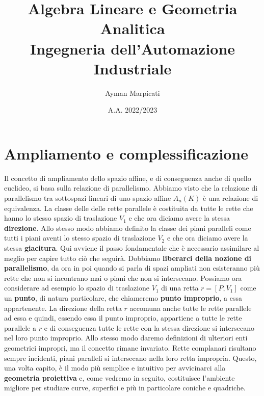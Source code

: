 \documentclass[twoside]{report}
\title{\Huge{Algebra Lineare e Geometria Analitica}\\Ingegneria dell'Automazione Industriale}
\author{\Large{Ayman Marpicati}}
\date{A.A. 2022/2023}
\begin{document}
\maketitle
\cleardoublepage
\tableofcontents
\null\newpage

\setlength{\headheight}{15pt}

\pagestyle{fancy}
\fancyhead{} %
\fancyhead[LO]{\rightmark}
\fancyhead[RO]{\thepage}
\fancyhead[RE]{\leftmark}
\fancyhead[LE]{\thepage}
\fancyfoot{} %










\chapter{Ampliamento e complessificazione}
Il concetto di ampliamento dello spazio affine, e di conseguenza anche di quello euclideo, si basa sulla relazione di parallelismo. Abbiamo visto che la relazione di parallelismo tra sottospazi lineari di uno spazio affine \(A_n(K)\) è una relazione di equivalenza. La classe delle delle rette parallele è costituita da tutte le rette che hanno lo stesso spazio di traslazione \(V_1\) e che ora diciamo avere la stessa \textbf{direzione}. Allo stesso modo abbiamo definito la classe dei piani paralleli come tutti i piani aventi lo stesso spazio di traslazione \(V_2\) e che ora diciamo avere la stessa \textbf{giacitura}. Qui avviene il passo fondamentale che è necessario assimilare al meglio per capire tutto ciò che seguirà. Dobbiamo \textbf{liberarci della nozione di parallelismo}, da ora in poi quando si parla di spazi ampliati non esisteranno più rette che non si incontrano mai o piani che non si intersecano. Possiamo ora considerare ad esempio lo spazio di traslazione \(V_1\) di una retta \(r = [P, V_1]\) come un \textbf{punto}, di natura particolare, che chiameremo \textbf{punto improprio}, a essa appartenente. La direzione della retta \(r\) accomuna anche tutte le rette parallele ad essa e quindi, essendo essa il punto improprio, appartiene a tutte le rette parallele a \(r\) e di conseguenza tutte le rette con la stessa direzione si intersecano nel loro punto improprio. Allo stesso modo daremo definizioni di ulteriori enti geometrici impropri, ma il concetto rimane invariato. Rette complanari risultano sempre incidenti, piani paralleli si intersecano nella loro retta impropria. Questo, una volta capito, è il modo più semplice e intuitivo per avvicinarci alla \textbf{geometria proiettiva} e, come vedremo in seguito, costituisce l'ambiente migliore per studiare curve, superfici e più in particolare coniche e quadriche.
\end{document}
